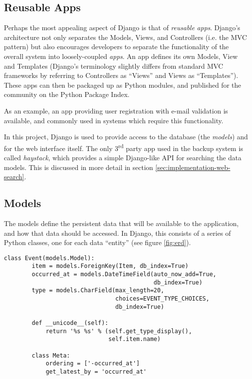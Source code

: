 \subsection{Reusable Apps}

Perhaps the most appealing aspect of Django is that of \emph{reusable apps}.
Django's architecture not only separates the Models, Views, and Controllers
(i.e. the MVC pattern) but also encourages developers to separate the
functionality of the overall system into loosely-coupled \emph{apps}. An app
defines its own Models, View and Templates (Django's terminology slightly
differs from standard MVC frameworks by referring to Controllers as ``Views''
and Views as ``Templates''). These apps can then be packaged up as Python
modules, and published for the community on the Python Package Index.

As an example, an app providing user registration with e-mail validation is
available, and commonly used in systems which require this functionality.

In this project, Django is used to provide access to the database (the
\emph{models}) and for the web interface itself. The only 3\textsuperscript{rd}
party app used in the backup system is called \emph{haystack}, which provides
a simple Django-like API for searching the data models. This is discussed in
more detail in section \ref{sec:implementation-web-search}.

\subsection{Models}
\label{sec:implementation-django-models}

The models define the persistent data that will be available to the
application, and how that data should be accessed. In Django, this consists of
a series of Python classes, one for each data ``entity'' (see figure
\ref{fig:erd}).

\begin{singlespacing}
\begin{lstlisting}[caption=The `Event' model, label=lst:event-model]
    class Event(models.Model):
        item = models.ForeignKey(Item, db_index=True)
        occurred_at = models.DateTimeField(auto_now_add=True,
                                           db_index=True)
        type = models.CharField(max_length=20,
                                choices=EVENT_TYPE_CHOICES,
                                db_index=True)

        def __unicode__(self):
            return '%s %s' % (self.get_type_display(),
                              self.item.name)

        class Meta:
            ordering = ['-occurred_at']
            get_latest_by = 'occurred_at'
\end{lstlisting}
\end{singlespacing}

